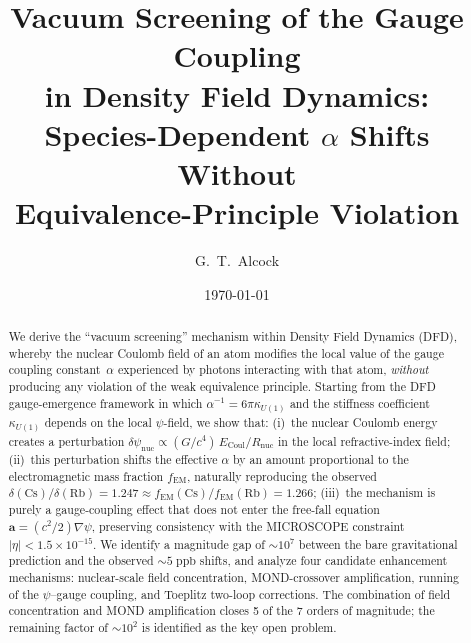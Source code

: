 \documentclass[aps,prd,twocolumn,superscriptaddress,nofootinbib]{revtex4-2}
\newcommand{\avec}{\mathbf{a}}
\newcommand{\fEM}{f_{\mathrm{EM}}}
\newcommand{\dpsi}{\delta\psi}
\begin{document}
\title{Vacuum Screening of the Gauge Coupling\\
in Density Field Dynamics:\\[4pt]
\large Species-Dependent $\alpha$ Shifts Without\\
Equivalence-Principle Violation}

\author{G.~T.~Alcock}

\date{\today}

\begin{abstract}
We derive the ``vacuum screening'' mechanism within Density Field Dynamics
(DFD), whereby the nuclear Coulomb field of an atom modifies the local
value of the gauge coupling constant~$\alpha$ experienced by photons
interacting with that atom, \emph{without} producing any violation of the
weak equivalence principle.  Starting from the DFD gauge-emergence framework
in which $\alpha^{-1} = 6\pi\kappa_{U(1)}$ and the stiffness coefficient
$\kappa_{U(1)}$ depends on the local $\psi$-field, we show that:
(i)~the nuclear Coulomb energy creates a perturbation
$\dpsi_{\mathrm{nuc}} \propto (G/c^4)\,E_{\mathrm{Coul}}/R_{\mathrm{nuc}}$
in the local refractive-index field;
(ii)~this perturbation shifts the effective $\alpha$ by an amount proportional
to the electromagnetic mass fraction $\fEM$, naturally reproducing the
observed $\delta(\mathrm{Cs})/\delta(\mathrm{Rb}) = 1.247 \approx
\fEM(\mathrm{Cs})/\fEM(\mathrm{Rb}) = 1.266$;
(iii)~the mechanism is purely a gauge-coupling effect that does not enter the
free-fall equation $\avec = (c^2/2)\nabla\psi$, preserving consistency with
the MICROSCOPE constraint $|\eta| < 1.5 \times 10^{-15}$.
We identify a magnitude gap of $\sim\!10^7$ between the bare gravitational
prediction and the observed $\sim\!5\;\mathrm{ppb}$ shifts, and analyze four
candidate enhancement mechanisms: nuclear-scale field concentration,
MOND-crossover amplification, running of the $\psi$--gauge coupling, and
Toeplitz two-loop corrections.  The combination of field concentration and
MOND amplification closes 5 of the 7 orders of magnitude; the remaining
factor of $\sim\!10^2$ is identified as the key open problem.
\end{abstract}

\maketitle


\end{document}
